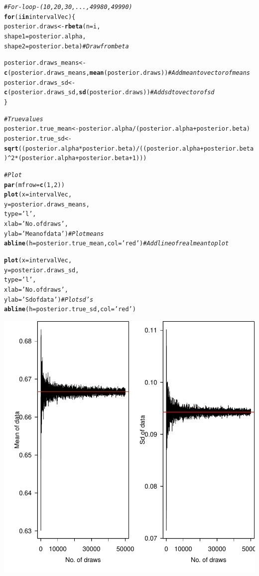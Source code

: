\documentclass{article}\usepackage[]{graphicx}\usepackage[]{color}
\makeatletter
\newcommand{\hlnum}[1]{\textcolor[rgb]{0.686,0.059,0.569}{#1}}%
\newcommand{\hlstr}[1]{\textcolor[rgb]{0.192,0.494,0.8}{#1}}%
\newcommand{\hlcom}[1]{\textcolor[rgb]{0.678,0.584,0.686}{\textit{#1}}}%
\newcommand{\hlopt}[1]{\textcolor[rgb]{0,0,0}{#1}}%
\newcommand{\hlstd}[1]{\textcolor[rgb]{0.345,0.345,0.345}{#1}}%
\newcommand{\hlkwa}[1]{\textcolor[rgb]{0.161,0.373,0.58}{\textbf{#1}}}%
\newcommand{\hlkwb}[1]{\textcolor[rgb]{0.69,0.353,0.396}{#1}}%
\newcommand{\hlkwc}[1]{\textcolor[rgb]{0.333,0.667,0.333}{#1}}%
\newcommand{\hlkwd}[1]{\textcolor[rgb]{0.737,0.353,0.396}{\textbf{#1}}}%
\newenvironment{kframe}{%
 \def\at@end@of@kframe{}%
 \ifinner\ifhmode%
  \def\at@end@of@kframe{\end{minipage}}%
  \begin{minipage}{\columnwidth}%
 \fi\fi%
 \def\FrameCommand##1{\hskip\@totalleftmargin \hskip-\fboxsep
 \colorbox{shadecolor}{##1}\hskip-\fboxsep
     \hskip-\linewidth \hskip-\@totalleftmargin \hskip\columnwidth}%
 \MakeFramed {\advance\hsize-\width
   \@totalleftmargin\z@ \linewidth\hsize
   \@setminipage}}%
 {\par\unskip\endMakeFramed%
 \at@end@of@kframe}
\newenvironment{knitrout}{}{} %
\makeatother
\begin{document}
\begin{knitrout}
\begin{kframe}
\begin{alltt}
\hlcom{# For-loop - (10, 20, 30, ..., 49980, 49990)}
\hlkwa{for} \hlstd{(i} \hlkwa{in} \hlstd{intervalVec) \{}
  \hlstd{posterior.draws} \hlkwb{<-} \hlkwd{rbeta}\hlstd{(}\hlkwc{n} \hlstd{= i,}
                           \hlkwc{shape1} \hlstd{= posterior.alpha,}
                           \hlkwc{shape2} \hlstd{= posterior.beta)} \hlcom{# Draw from beta}

  \hlstd{posterior.draws_means} \hlkwb{<-} \hlkwd{c}\hlstd{(posterior.draws_means,} \hlkwd{mean}\hlstd{(posterior.draws))} \hlcom{# Add mean to vector of means}
  \hlstd{posterior.draws_sd} \hlkwb{<-} \hlkwd{c}\hlstd{(posterior.draws_sd,} \hlkwd{sd}\hlstd{(posterior.draws))} \hlcom{# Add sd to vector of sd}
\hlstd{\}}

\hlcom{# True values}
\hlstd{posterior.true_mean} \hlkwb{<-} \hlstd{posterior.alpha}\hlopt{/}\hlstd{(posterior.alpha} \hlopt{+} \hlstd{posterior.beta)}
\hlstd{posterior.true_sd} \hlkwb{<-} \hlkwd{sqrt}\hlstd{((posterior.alpha}\hlopt{*}\hlstd{posterior.beta)}\hlopt{/}\hlstd{((posterior.alpha} \hlopt{+} \hlstd{posterior.beta)}\hlopt{^}\hlnum{2} \hlopt{*} \hlstd{(posterior.alpha} \hlopt{+} \hlstd{posterior.beta} \hlopt{+} \hlnum{1}\hlstd{)))}

\hlcom{# Plot}
\hlkwd{par}\hlstd{(}\hlkwc{mfrow} \hlstd{=} \hlkwd{c}\hlstd{(}\hlnum{1}\hlstd{,} \hlnum{2}\hlstd{))}
\hlkwd{plot}\hlstd{(}\hlkwc{x} \hlstd{= intervalVec,}
     \hlkwc{y} \hlstd{= posterior.draws_means,}
     \hlkwc{type} \hlstd{=} \hlstr{'l'}\hlstd{,}
     \hlkwc{xlab} \hlstd{=} \hlstr{'No. of draws'}\hlstd{,}
     \hlkwc{ylab} \hlstd{=} \hlstr{'Mean of data'}\hlstd{)} \hlcom{# Plot means}
\hlkwd{abline}\hlstd{(}\hlkwc{h} \hlstd{= posterior.true_mean,} \hlkwc{col} \hlstd{=} \hlstr{'red'}\hlstd{)} \hlcom{# Add line of real mean to plot}

\hlkwd{plot}\hlstd{(}\hlkwc{x} \hlstd{= intervalVec,}
     \hlkwc{y} \hlstd{= posterior.draws_sd,}
     \hlkwc{type} \hlstd{=} \hlstr{'l'}\hlstd{,}
     \hlkwc{xlab} \hlstd{=} \hlstr{'No. of draws'}\hlstd{,}
     \hlkwc{ylab} \hlstd{=} \hlstr{'Sd of data'}\hlstd{)} \hlcom{# Plot sd's}
\hlkwd{abline}\hlstd{(}\hlkwc{h} \hlstd{= posterior.true_sd,} \hlkwc{col} \hlstd{=} \hlstr{'red'}\hlstd{)}
\end{alltt}
\end{kframe}

{\centering \includegraphics[width=.6\linewidth]{figure/lab1-Rnwauto-report-1} 

}
\end{knitrout}
\end{document}
